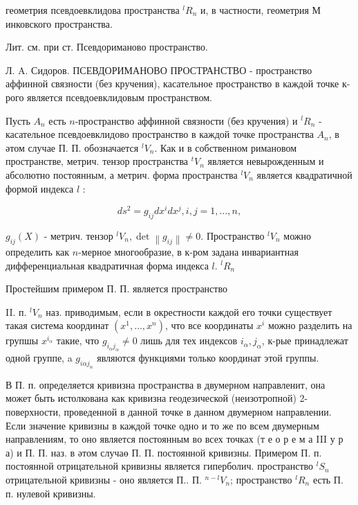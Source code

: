 \documentclass[10pt]{article}
\begin{document}
геометрия псевдоевклидова пространства ${ }^{l} R_{n}$ и, в частности, геометрия $М$ инковского пространства.



Лит. см. при ст. Псевдориманово пространство.



Л. A. Сидоров. ПСЕВДОРИМАНОВО ПРОСТРАНСТВО - пространство аффинной связности (без кручения), касательное пространство в каждой точке к-рого является псевдоевклидовым пространством.



Пусть $A_{n}$ есть $n$-пространство аффинной связности (без кручения) и ${ }^{l} R_{n}$ - касательное псевдоевклидово пространство в каждой точке пространства $A_{n}$, в әтом случае П. П. обозначается ${ }^{l} V_{n}$. Как и в собственном римановом пространстве, метрич. тензор пространства ${ }^{t} V_{n}$ является невырожденным и абсолютно постоянным, а метрич. форма пространства ${ }^{l} V_{n}$ является квадратичной формой индекса $l$ :



\[

d s^{2}=g_{i j} d x^{i} d x^{j}, i, j=1, \ldots, n,

\]



$g_{i j}(X)$ - метрич. тензор ${ }^{l} V_{n}, \operatorname{det}\left\|g_{i j}\right\| \neq 0$. Пространство ${ }^{l} V_{n}$ можно определить как $n$-мерное многообразие, в к-ром задана инвариантная дифференциальная квадратичная форма индекса $l$. ${ }^{l} R_{n}$



Простейшим примером П. П. является пространство



II. п. ${ }^{l} V_{n}$ наз. приводимым, если в окрестности каждой его точки существует такая система координат $\left(x^{1}, \ldots, x^{n}\right)$, что все координаты $x^{i}$ можно разделить на групшы $x^{i_{\alpha}}$ такие, что $g_{i_{\alpha} j_{\alpha}} \neq 0$ лишь для тех индексов $i_{\alpha}, j_{\alpha}$, к-рые принадлежат одной группе, a $g_{i \alpha j_{\alpha}}$ являются функциями только координат этой группы.



В П. п. определяется кривизна пространства в двумерном направленит, она может быть истолкована как кривизна геодезической (неизотропной) 2-поверхности, проведенной в данной точке в данном двумерном направлении. Если значение кривизны в каждой точке одно и то же по всем двумерным направлениям, то оно является постоянным во всех точках (т е о р е м а III у р а) и П. П. наз. в әтом случаө П. П. постоянной кривизны. Примером П. п. постоянной отрицательной кривизны является гиперболич. пространство ${ }^{l} S_{n}$ отрицательной кривизны - оно является П.. П. ${ }^{n-l} V_{n}$; пространство ${ }^{l} R_{n}$ есть П. п. нулевой кривизны.
\end{document}
